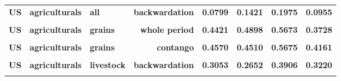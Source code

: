 \documentclass[
  authoryear,
  preprint,
  3p]{elsarticle}
\begin{document}
\begin{longtable}[t]{>{}l>{}l>{}l>{}r>{}r>{}r>{}r>{}r}
\textbf{US} & \textbf{agriculturals} & \textbf{all} & \textbf{backwardation} & \textcolor[HTML]{4285f4}{\textbf{0.0799}} & \textcolor[HTML]{4285f4}{\textbf{0.1421}} & \textcolor[HTML]{4285f4}{\textbf{0.1975}} & \textcolor[HTML]{4285f4}{\textbf{0.0955}}\\
\textbf{\cellcolor{gray!10}{US}} & \textbf{\cellcolor{gray!10}{agriculturals}} & \textbf{\cellcolor{gray!10}{all}} & \textbf{\cellcolor{gray!10}{contango}} & \textcolor[HTML]{4285f4}{\textbf{\cellcolor{gray!10}{0.1018}}} & \textcolor[HTML]{4285f4}{\textbf{\cellcolor{gray!10}{0.1184}}} & \textcolor[HTML]{4285f4}{\textbf{\cellcolor{gray!10}{0.2611}}} & \textcolor[HTML]{4285f4}{\textbf{\cellcolor{gray!10}{0.1186}}}\\
\textbf{US} & \textbf{agriculturals} & \textbf{grains} & \textbf{whole period} & \textcolor[HTML]{4285f4}{\textbf{0.4421}} & \textcolor[HTML]{4285f4}{\textbf{0.4898}} & \textcolor[HTML]{4285f4}{\textbf{0.5673}} & \textcolor[HTML]{4285f4}{\textbf{0.3728}}\\
\addlinespace
\textbf{\cellcolor{gray!10}{US}} & \textbf{\cellcolor{gray!10}{agriculturals}} & \textbf{\cellcolor{gray!10}{grains}} & \textbf{\cellcolor{gray!10}{backwardation}} & \textcolor[HTML]{4285f4}{\textbf{\cellcolor{gray!10}{0.4312}}} & \textcolor[HTML]{4285f4}{\textbf{\cellcolor{gray!10}{0.5283}}} & \textcolor[HTML]{4285f4}{\textbf{\cellcolor{gray!10}{0.5749}}} & \textcolor[HTML]{4285f4}{\textbf{\cellcolor{gray!10}{0.3289}}}\\
\textbf{US} & \textbf{agriculturals} & \textbf{grains} & \textbf{contango} & \textcolor[HTML]{4285f4}{\textbf{0.4570}} & \textcolor[HTML]{4285f4}{\textbf{0.4510}} & \textcolor[HTML]{4285f4}{\textbf{0.5675}} & \textcolor[HTML]{4285f4}{\textbf{0.4161}}\\
\textbf{\cellcolor{gray!10}{US}} & \textbf{\cellcolor{gray!10}{agriculturals}} & \textbf{\cellcolor{gray!10}{livestock}} & \textbf{\cellcolor{gray!10}{whole period}} & \textcolor[HTML]{4285f4}{\textbf{\cellcolor{gray!10}{0.3340}}} & \textcolor[HTML]{4285f4}{\textbf{\cellcolor{gray!10}{0.2868}}} & \textcolor[HTML]{4285f4}{\textbf{\cellcolor{gray!10}{0.3707}}} & \textcolor[HTML]{4285f4}{\textbf{\cellcolor{gray!10}{0.3333}}}\\
\textbf{US} & \textbf{agriculturals} & \textbf{livestock} & \textbf{backwardation} & \textcolor[HTML]{4285f4}{\textbf{0.3053}} & \textcolor[HTML]{4285f4}{\textbf{0.2652}} & \textcolor[HTML]{4285f4}{\textbf{0.3906}} & \textcolor[HTML]{4285f4}{\textbf{0.3220}}\\
\textbf{\cellcolor{gray!10}{US}} & \textbf{\cellcolor{gray!10}{agriculturals}} & \textbf{\cellcolor{gray!10}{livestock}} & \textbf{\cellcolor{gray!10}{contango}} & \textcolor[HTML]{4285f4}{\textbf{\cellcolor{gray!10}{0.3605}}} & \textcolor[HTML]{4285f4}{\textbf{\cellcolor{gray!10}{0.3150}}} & \textcolor[HTML]{4285f4}{\textbf{\cellcolor{gray!10}{0.3557}}} & \textcolor[HTML]{4285f4}{\textbf{\cellcolor{gray!10}{0.3483}}}\\

\end{longtable}
\end{document}
